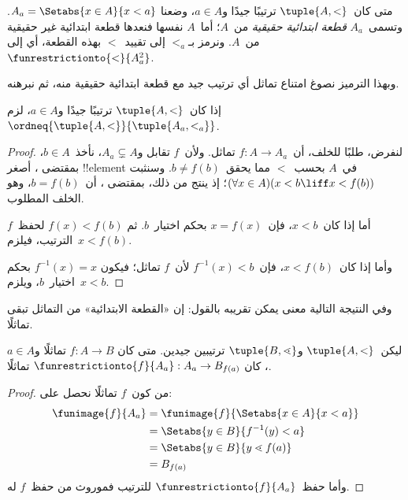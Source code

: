 \documentclass[../../../include/open-logic-section]{subfiles}
\begin{document}
\begin{defn}
متى كان~$\tuple{A, <}$ ترتيبًا جيدًا و$a \in A$، وضعنا
$A_a = \Setabs{x \in A}{x < a}$. وتسمى~$A_a$ \emph{قطعة ابتدائية
حقيقية} من~$A$؛ أما~$A$ نفسها فنعدها قطعة ابتدائية غير حقيقية من~$A$.
ونرمز بـ$<_a$ إلى تقييد~$<$ بهذه القطعة، أي إلى
$\funrestrictionto{\mathord{<}}{A_a^2}$.
\end{defn}
\noindent
وبهذا الترميز نصوغ امتناع تماثل أي ترتيب جيد مع قطعة ابتدائية حقيقية
منه، ثم نبرهنه.

\begin{lem}
إذا كان~$\tuple{A, <}$ ترتيبًا جيدًا و$a \in A$، لزم
$\ordneq{\tuple{A, <}}{\tuple{A_a, <_a}}$.
\end{lem}

\begin{proof}
لنفرض، طلبًا للخلف، أن~$f \colon A \to A_a$ تماثل. ولأن~$f$ تقابل
و$A_a \subsetneq A$، نأخذ~$b \in A$، بمقتضى
، أصغر !!{element} في~$A$ بحسب~$<$
مما يحقق~$b \neq f(b)$. وسنثبت
$(\forall x \in A)(x<b \liff x < f(b))$؛ إذ ينتج من ذلك، بمقتضى
،
أن~$b = f(b)$، وهو الخلف المطلوب.

أما إذا كان~$x < b$، فإن~$x = f(x)$ بحكم اختيار~$b$. ثم
$f(x) < f(b)$ لحفظ~$f$ الترتيب، فيلزم~$x < f(b)$.

وأما إذا كان~$x < f(b)$، فإن~$f^{-1}(x) < b$ لأن~$f$ تماثل؛ فيكون
$f^{-1}(x) = x$ بحكم اختيار~$b$، ويلزم~$x < b$.
\end{proof}

وفي النتيجة التالية معنى يمكن تقريبه بالقول: إن «القطعة الابتدائية»
من التماثل تبقى تماثلًا.

\begin{lem}
ليكن~$\tuple{A, <}$ و$\tuple{B, \lessdot}$ ترتيبين جيدين. متى كان
$f \colon A \to B$ تماثلًا و$a \in A$، كان
$\funrestrictionto{f}{A_{a}} : A_a \to B_{f(a)}$ تماثلًا.
\end{lem}

\begin{proof}
من كون~$f$ تماثلًا نحصل على:
\begin{align*}
\funimage{f}{A_a} &= \funimage{f}{\Setabs{x \in A}{x < a}}\\
&= \Setabs{y \in B}{f^{-1}(y)<a} \\
&= \Setabs{y \in B}{y \lessdot f(a)} \\
&=B_{f(a)}
\end{align*}
وأما حفظ~$\funrestrictionto{f}{A_a}$ للترتيب فموروث من حفظ~$f$ له.
\end{proof}
\end{document}
